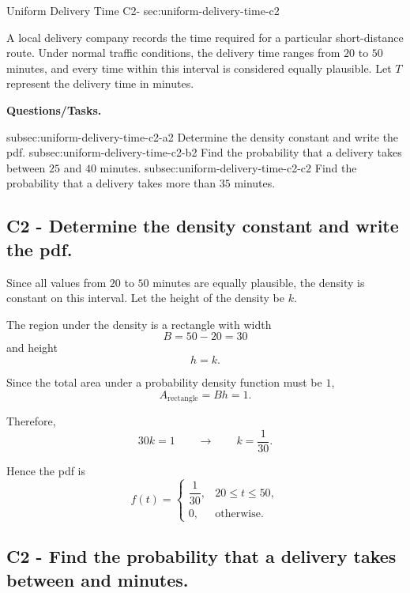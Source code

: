 	\sectionScored
	{Uniform Delivery Time}
	{C2-}
	{sec:uniform-delivery-time-c2}
	{
	A local delivery company records the time required for a particular short-distance route. Under normal traffic conditions, the delivery time ranges from $20$ to $50$ minutes, and every time within this interval is considered equally plausible. Let $T$ represent the delivery time in minutes.
	
	\textbf{Questions/Tasks.}
	\begin{enumerate}
		\CriterionTask
		{subsec:uniform-delivery-time-c2-a}{2}
		{Determine the density constant and write the pdf. }
		\CriterionTask
		{subsec:uniform-delivery-time-c2-b}{2}
		{Find the probability that a delivery takes between $25$ and $40$ minutes. }
		\CriterionTask
		{subsec:uniform-delivery-time-c2-c}{2}
		{Find the probability that a delivery takes more than $35$ minutes. }
	\end{enumerate}
	
	\label{subsec:uniform-delivery-time-c2-a}
	\subsection*{C2 - Determine the density constant and write the pdf. }
	
	Since all values from $20$ to $50$ minutes are equally plausible, the density is constant on this interval. Let the height of the density be $k$.
	
	The region under the density is a rectangle with width
	\[
	B=50-20=30
	\]
	and height
	\[
	h=k.
	\]
	
	Since the total area under a probability density function must be $1$,
	\[
	A_{\text{rectangle}}=Bh=1.
	\]
	
	Therefore,
	\[
	30k=1
	\qquad \longrightarrow \qquad
	k=\frac{1}{30}.
	\]
	
	Hence the pdf is
	\[
	f(t)=
	\begin{cases}
		\dfrac{1}{30}, & 20\le t\le 50,\\[6pt]
		0, & \text{otherwise.}
	\end{cases}
	\]
	

	\label{subsec:uniform-delivery-time-c2-b}
	\subsection*{C2 - Find the probability that a delivery takes between  and  minutes. }
	
}
